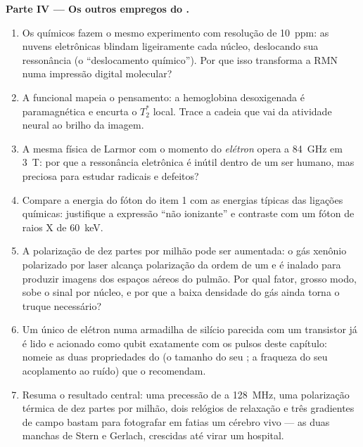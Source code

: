 \begin{problem}
\medskip\noindent\textbf{Parte IV --- Os outros empregos do .}
\begin{enumerate}[resume]
  \item Os químicos fazem o mesmo experimento com resolução de
        \qty{10}{ppm}: as nuvens eletrônicas blindam ligeiramente cada
        núcleo, deslocando sua ressonância (o ``deslocamento
        químico''). Por que isso transforma a RMN numa impressão
        digital molecular?
  \item A  funcional mapeia o pensamento: a
        hemoglobina desoxigenada é paramagnética e encurta o $T_2^*$
        local. Trace a cadeia que vai da atividade neural ao brilho da
        imagem.
  \item A mesma física de Larmor com o momento do \emph{elétron} opera
        a \qty{84}{GHz} em \qty{3}{T}: por que a ressonância eletrônica
        é inútil dentro de um ser humano, mas preciosa para estudar
        radicais e defeitos?
  \item Compare a energia do fóton do item 1 com as energias típicas
        das ligações químicas: justifique a expressão ``não ionizante''
        e contraste com um fóton de raios X de \qty{60}{keV}.
  \item A polarização de dez partes por milhão pode ser aumentada: o
        gás xenônio polarizado por laser alcança polarização da ordem
        de um e é inalado para produzir imagens dos espaços aéreos do
        pulmão. Por qual fator, grosso modo, sobe o sinal por núcleo, e
        por que a baixa densidade do gás ainda torna o truque
        necessário?
  \item Um único  de elétron numa armadilha de silício parecida com
        um transistor já é lido e acionado como qubit exatamente com os
        pulsos deste capítulo: nomeie as duas propriedades do  (o
        tamanho do seu ; a fraqueza do seu acoplamento
        ao ruído) que o recomendam.
  \item Resuma o resultado central: uma precessão de  a
        \qty{128}{MHz}, uma polarização térmica de dez partes por
        milhão, dois relógios de relaxação e três gradientes de campo
        bastam para fotografar em fatias um cérebro vivo --- as duas
        manchas de Stern e Gerlach, crescidas até virar um hospital.
\end{enumerate}
\end{problem}
